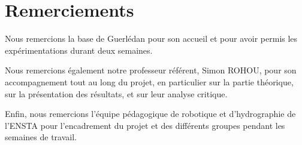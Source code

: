 \section*{Remerciements}
Nous remercions la base de Guerlédan pour son accueil et pour avoir permis les expérimentations durant deux semaines.

Nous remercions également notre professeur référent, Simon ROHOU, pour son accompagnement tout au long du projet, en particulier sur la partie théorique, sur la présentation des résultats, et sur leur analyse critique.

Enfin, nous remercions l'équipe pédagogique de robotique et d'hydrographie de l'ENSTA pour l'encadrement du projet et des différents groupes pendant les semaines de travail.

\newpage
